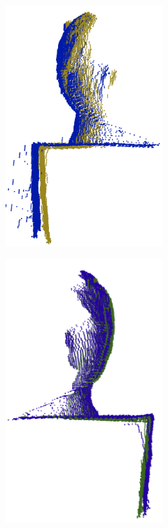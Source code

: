 \begin{figure}[h]
\begin{subfigure}[b]{0.32\textwidth}
		\includegraphics[width=0.65\textwidth]{figures/icp0.png}
		\caption{}
		\label{fig:icp:b}
	\end{subfigure}
	\hfill
	\begin{subfigure}[b]{0.32\textwidth}
		\centering
		\includegraphics[width=0.65\textwidth]{figures/icp2.png}

\end{subfigure}
\end{figure}
